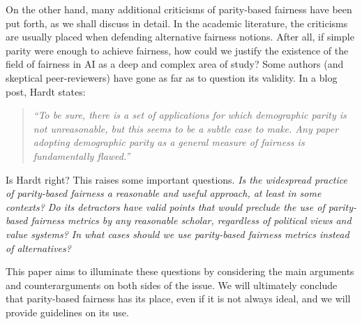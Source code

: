 \documentclass[11pt,dvipdfm]{article}
\begin{document}
On the other hand, many additional criticisms of parity-based fairness have been put forth, as we shall discuss in detail.  In the academic literature, the criticisms are usually placed when defending alternative fairness notions.  After all, if simple parity were enough to achieve fairness, how could we justify the existence of the field of fairness in AI as a deep and complex area of study?   Some authors (and skeptical peer-reviewers) have gone as far as to question its validity.  In a blog post, Hardt \cite{Hardt2016approaching} states:
\begin{quote}
    \emph{``To be sure, there is a set of applications for which demographic parity is not unreasonable, but this seems to be a subtle case to make. Any paper adopting demographic parity as a general measure of fairness is fundamentally flawed.''\cite{Hardt2016approaching}}
\end{quote}
Is Hardt right?  This raises some important questions.  \emph{Is the widespread practice of parity-based fairness a reasonable and useful approach, at least in some contexts?  Do its detractors have valid points that would preclude the use of parity-based fairness metrics by any reasonable scholar, regardless of political views and value systems?  In what cases should we use parity-based fairness metrics instead of alternatives?}

This paper aims to illuminate these questions by considering the main arguments and counterarguments on both sides of the issue.  We will ultimately conclude that parity-based fairness has its place, even if it is not always ideal, and we will provide guidelines on its use.
\end{document}
